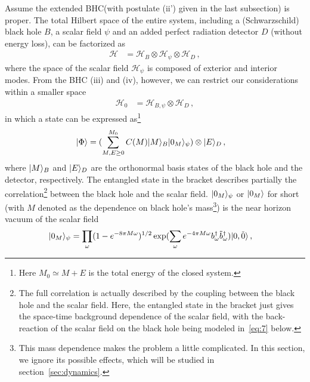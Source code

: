 \documentclass[12pt,a4paper]{article}
\begin{document}
Assume the extended BHC(with postulate (ii') given in the last subsection) is proper. The
total Hilbert space of the entire system, including a (Schwarzschild) black hole
$B$, a scalar field $\psi$ and an added perfect radiation detector
$D$ (without energy loss), can be factorized as
\begin{equation}
\label{eq:1}
\begin{split}
\mathcal {H} &= \mathcal {H}_B\otimes\mathcal
{H}_{\psi}\otimes\mathcal {H}_D \,,
\end{split}
\end{equation}
where the space of the scalar field $\mathcal
{H}_{\psi}$ is composed of exterior and interior modes. From the BHC (iii) and (iv), however, we can restrict our considerations
within a smaller space
\begin{equation}
\label{eq:2}
\begin{split}
\mathcal {H}_0 &= \mathcal {H}_{B,\psi}\otimes\mathcal {H}_D \,,
\end{split}
\end{equation}
in which a state can be expressed as\footnote{Here $M_0\simeq M+E$ is the total energy of the closed system.}
\begin{equation}
\label{eq:3}
\begin{split}
\arrowvert\Phi\rangle
&=(\sum_{M,E\geq0}^{M_0}C(M)\arrowvert
M\rangle_{B}\arrowvert0_{M}\rangle_{\psi})\otimes\arrowvert
E\rangle_D\,,
\end{split}
\end{equation}
where $\arrowvert M\rangle_{B}$ and $\arrowvert E\rangle_D$ are the
orthonormal basis states of the black hole and the detector,
respectively. The entangled state in the bracket describes partially
the correlation\footnote{The full correlation is actually described
by the coupling between the black hole and the scalar field. Here, the
entangled state in the bracket just gives the space-time
background dependence of the scalar field, with the back-reaction of the scalar field on the black hole being
modeled in~\eqref{eq:7} below.} between the black hole and the scalar field. $\arrowvert0_{M}\rangle_{\psi}$ or $\arrowvert0_{M}\rangle$ for short (with $M$ denoted as the
dependence on black hole's mass\footnote{This mass dependence
makes the problem a little complicated. In this section, we ignore
its possible effects, which will be studied in section~\ref{sec:dynamics}.}) is the near horizon vacuum of the scalar field~\cite{j}
\begin{equation}
\label{eq:4}
\begin{split}
\arrowvert0_{M}\rangle_{\psi} &= \prod_\omega(1-e^{-8\pi
M\omega})^{1/2}\exp(\sum_{\omega}e^{-4\pi
M\omega}b_{\omega}^{\dag}\tilde{b}_{\omega}^{\dag})\arrowvert0,\tilde{0}\rangle\,,
\end{split}
\end{equation}
\end{document}
